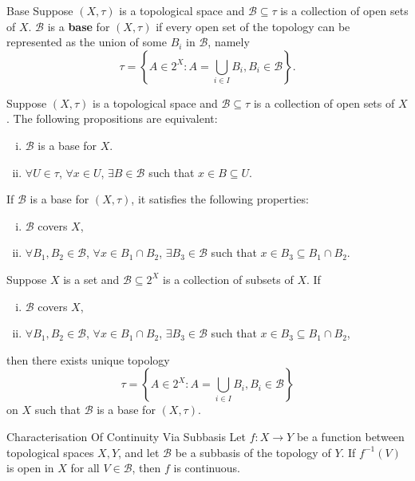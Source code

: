 \documentclass{report}
\begin{document}
\begin{definition}{Base}{}
	Suppose $(X,\tau)$ is a topological space and $\mathcal{B}\subseteq \tau $ is a collection of open sets of $X$. $\mathcal{B}$ is a \textbf{base} for $(X,\tau)$ if every open set of the topology can be represented as the union of some $B_i$ in $\mathcal{B}$, namely
	\[
		\tau=\left\{A\in 2^X:A=\bigcup_{i\in I} B_i,B_i\in\mathcal{B}\right\}.
	\]
\end{definition}

\begin{proposition}{}{}
	Suppose $(X,\tau)$ is a topological space and $\mathcal{B}\subseteq \tau $ is a collection of open sets of $X$. The following propositions are equivalent:
	\begin{enumerate}[(i)] 
		\item $\mathcal{B}$ is a base for $X$.
		\item $\forall U\in \tau$, $\forall x\in U$, $\exists B\in\mathcal{B}$ such that $x\in B\subseteq U$. 
	\end{enumerate}
\end{proposition}


\begin{proposition}{}{}
	If $\mathcal{B}$ is a base for $(X,\tau)$, it satisfies the following properties:
\begin{enumerate}[(i)] 
	\item $\mathcal{B}$ covers $X$,
	\item $\forall B_1,B_2\in\mathcal{B}$, $\forall x\in B_1\cap B_2$, $\exists B_3\in \mathcal{B}$ such that $x\in B_3\subseteq B_1\cap B_2$.
\end{enumerate}
\end{proposition}


\begin{proposition}{}{}
	Suppose $X$ is a set and $\mathcal{B}\subseteq 2^X $ is a collection of subsets of $X$. If
\begin{enumerate}[(i)] 
	\item $\mathcal{B}$ covers $X$,
	\item $\forall B_1,B_2\in\mathcal{B}$, $\forall x\in B_1\cap B_2$, $\exists B_3\in \mathcal{B}$ such that $x\in B_3\subseteq B_1\cap B_2$,
\end{enumerate}
then there exists unique topology
\[
	\tau=\left\{A\in 2^X:A=\bigcup_{i\in I} B_i,B_i\in\mathcal{B}\right\}
\]
on $X$ such that $\mathcal{B}$ is a base for $(X,\tau)$.
\end{proposition}


\begin{proposition}{Characterisation Of Continuity Via Subbasis}{}
	Let $f: X \rightarrow Y$ be a function between topological spaces $X, Y$, and let $\mathcal{B}$ be a subbasis of the topology of $Y$. If $f^{-1}(V)$ is open in $X$ for all $V \in \mathcal{B}$, then $f$ is continuous.
\end{proposition}
\end{document}

